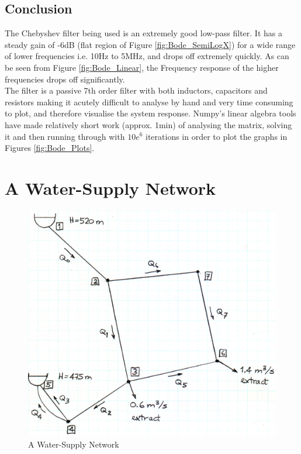 \documentclass[11pt,a4paper]{article}
\begin{document}
\subsection{Conclusion}
The Chebyshev filter being used is an extremely good low-pass filter. It has a steady gain of -6dB (flat region of Figure \ref{fig:Bode_SemiLogX}) for a wide range of lower frequencies i.e. 10Hz to 5MHz, and drops off extremely quickly. As can be seen from Figure \ref{fig:Bode_Linear}, the Frequency response of the higher frequencies drops off significantly.\\

The filter is a passive 7th order filter with both inductors, capacitors and resistors making it acutely difficult to analyse by hand and very time consuming to plot, and therefore visualise the system response. Numpy's linear algebra tools have made relatively short work (approx. 1min) of analysing the matrix, solving it and then running through with $10e^{6}$ iterations in order to plot the graphs in Figures \ref{fig:Bode_Plots}.\\



\newpage
\clearpage

\section{A Water-Supply Network} \label{sec:pipes}

\medskip
\begin{figure}[h]
	\centering	\includegraphics[width=0.6\linewidth]{Images/PipeNetwork.png}
	\caption{A Water-Supply Network}
	\label{fig:PipeNetwork}
\end{figure}
\end{document}
